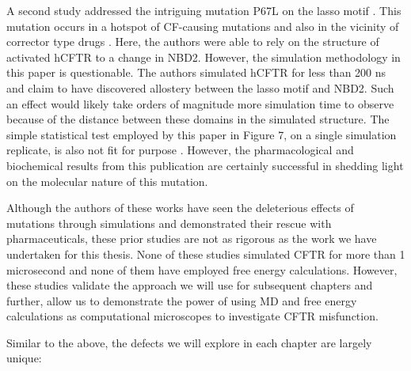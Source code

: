 A second study addressed the intriguing mutation P67L on the lasso motif \cite{sabusap2021}. This mutation occurs in a hotspot of CF-causing mutations and also in the vicinity of corrector type drugs \cite{gene2008, fiedorczuk2022}. Here, the authors were able to rely on the structure of activated hCFTR to  a change in NBD2. However, the simulation methodology in this paper is questionable. The authors simulated hCFTR for less than 200 ns and claim to have discovered allostery between the lasso motif and NBD2. Such an effect would likely take orders of magnitude more simulation time to observe because of the distance between these domains in the simulated structure. The simple statistical test employed by this paper in Figure 7, on a single simulation replicate, is also not fit for purpose \cite{knapp2018}. However, the pharmacological and biochemical results from this publication are certainly successful in shedding light on the molecular nature of this mutation.

Although the authors of these works have seen the deleterious effects of mutations through simulations and demonstrated their rescue with pharmaceuticals, these prior studies are not as rigorous as the work we have undertaken for this thesis. None of these studies simulated CFTR for more than 1 microsecond and none of them have employed free energy calculations. However, these studies validate the approach we will use for subsequent chapters and further, allow us to demonstrate the power of using MD and free energy calculations as computational microscopes to investigate CFTR misfunction. 

Similar to the above, the defects we will explore in each chapter are largely unique: 

